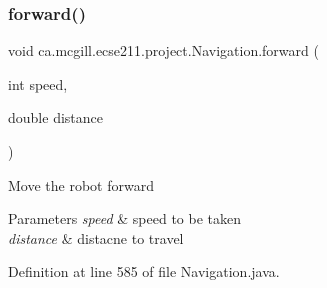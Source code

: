 \subsubsection{\texorpdfstring{forward()}{forward()}}
{\footnotesize\ttfamily void ca.\+mcgill.\+ecse211.\+project.\+Navigation.\+forward (\begin{DoxyParamCaption}\item[{int}]{speed,  }\item[{double}]{distance }\end{DoxyParamCaption})}

Move the robot forward


\begin{DoxyParams}{Parameters}
{\em speed} & speed to be taken \\
\hline
{\em distance} & distacne to travel \\
\hline
\end{DoxyParams}


Definition at line 585 of file Navigation.\+java.


